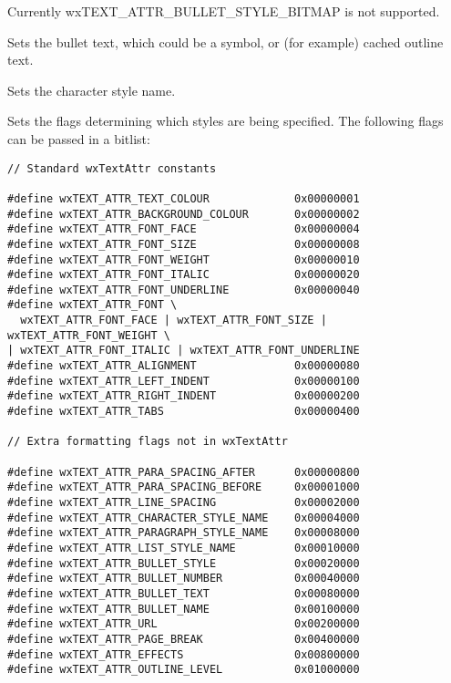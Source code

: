 Currently wxTEXT\_ATTR\_BULLET\_STYLE\_BITMAP is not supported.

\label{wxrichtextattrsetbullettext}


Sets the bullet text, which could be a symbol, or (for example) cached outline text.

\label{wxrichtextattrsetcharacterstylename}


Sets the character style name.

\label{wxrichtextattrsetflags}


Sets the flags determining which styles are being specified. The following
flags can be passed in a bitlist:

{\small
\begin{verbatim}
// Standard wxTextAttr constants

#define wxTEXT_ATTR_TEXT_COLOUR             0x00000001
#define wxTEXT_ATTR_BACKGROUND_COLOUR       0x00000002
#define wxTEXT_ATTR_FONT_FACE               0x00000004
#define wxTEXT_ATTR_FONT_SIZE               0x00000008
#define wxTEXT_ATTR_FONT_WEIGHT             0x00000010
#define wxTEXT_ATTR_FONT_ITALIC             0x00000020
#define wxTEXT_ATTR_FONT_UNDERLINE          0x00000040
#define wxTEXT_ATTR_FONT \
  wxTEXT_ATTR_FONT_FACE | wxTEXT_ATTR_FONT_SIZE | wxTEXT_ATTR_FONT_WEIGHT \
| wxTEXT_ATTR_FONT_ITALIC | wxTEXT_ATTR_FONT_UNDERLINE
#define wxTEXT_ATTR_ALIGNMENT               0x00000080
#define wxTEXT_ATTR_LEFT_INDENT             0x00000100
#define wxTEXT_ATTR_RIGHT_INDENT            0x00000200
#define wxTEXT_ATTR_TABS                    0x00000400

// Extra formatting flags not in wxTextAttr

#define wxTEXT_ATTR_PARA_SPACING_AFTER      0x00000800
#define wxTEXT_ATTR_PARA_SPACING_BEFORE     0x00001000
#define wxTEXT_ATTR_LINE_SPACING            0x00002000
#define wxTEXT_ATTR_CHARACTER_STYLE_NAME    0x00004000
#define wxTEXT_ATTR_PARAGRAPH_STYLE_NAME    0x00008000
#define wxTEXT_ATTR_LIST_STYLE_NAME         0x00010000
#define wxTEXT_ATTR_BULLET_STYLE            0x00020000
#define wxTEXT_ATTR_BULLET_NUMBER           0x00040000
#define wxTEXT_ATTR_BULLET_TEXT             0x00080000
#define wxTEXT_ATTR_BULLET_NAME             0x00100000
#define wxTEXT_ATTR_URL                     0x00200000
#define wxTEXT_ATTR_PAGE_BREAK              0x00400000
#define wxTEXT_ATTR_EFFECTS                 0x00800000
#define wxTEXT_ATTR_OUTLINE_LEVEL           0x01000000
\end{verbatim}
}


